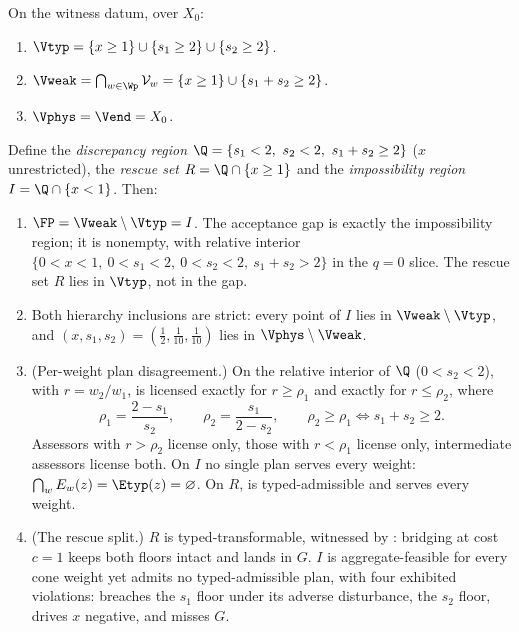 \begin{theorem}\label{thm:witness}
On the witness datum, over $X_0$:
\begin{enumerate}[label=\textup{(\arabic*)},leftmargin=2em]
\item $\Vtyp=\{x\ge1\}\cup\{s_1\ge2\}\cup\{s_2\ge2\}$.
\item $\Vweak=\bigcap_{w\in\Wp}\mathcal V_w=\{x\ge1\}\cup\{s_1+s_2\ge2\}$.
\item $\Vphys=\Vend=X_0$.
\end{enumerate}
Define the \emph{discrepancy region} $\Q=\{s_1<2,\ s_2<2,\ s_1+s_2\ge2\}$ ($x$ unrestricted), the \emph{rescue set} $R=\Q\cap\{x\ge1\}$ and the \emph{impossibility region} $I=\Q\cap\{x<1\}$. Then:
\begin{enumerate}[label=\textup{(\arabic*)},leftmargin=2em,resume]
\item $\FP=\Vweak\setminus\Vtyp=I$. The acceptance gap is exactly the impossibility region; it is nonempty, with relative interior $\{0<x<1,\ 0<s_1<2,\ 0<s_2<2,\ s_1+s_2>2\}$ in the $q=0$ slice. The rescue set $R$ lies in $\Vtyp$, not in the gap.
\item Both hierarchy inclusions are strict: every point of $I$ lies in $\Vweak\setminus\Vtyp$, and $(x,s_1,s_2)=(\tfrac12,\tfrac1{10},\tfrac1{10})$ lies in $\Vphys\setminus\Vweak$.
\item \textup{(Per-weight plan disagreement.)} On the relative interior of $\Q$ ($0<s_2<2$), with $r=w_2/w_1$,  is licensed exactly for $r\ge\rho_1$ and  exactly for $r\le\rho_2$, where
\[
\rho_1=\frac{2-s_1}{s_2},\qquad \rho_2=\frac{s_1}{2-s_2},\qquad \rho_2\ge\rho_1\iff s_1+s_2\ge2 .
\]
Assessors with $r>\rho_2$ license  only, those with $r<\rho_1$ license  only, intermediate assessors license both. On $I$ no single plan serves every weight: $\bigcap_wE_w(z)=\Etyp(z)=\varnothing$. On $R$,  is typed-admissible and serves every weight.
\item \textup{(The rescue split.)} $R$ is typed-transformable, witnessed by : bridging at cost $c=1$ keeps both floors intact and lands in $G$. $I$ is aggregate-feasible for every cone weight yet admits no typed-admissible plan, with four exhibited violations:  breaches the $s_1$ floor under its adverse disturbance,  the $s_2$ floor,  drives $x$ negative, and  misses $G$.
\end{enumerate}
\end{theorem}

